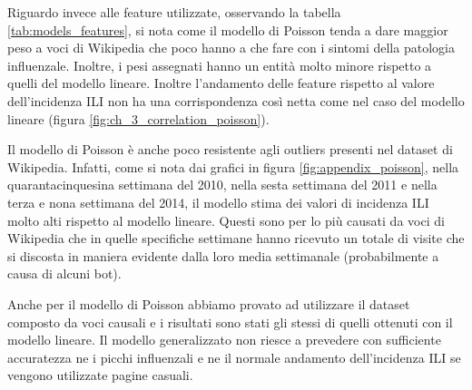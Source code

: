 Riguardo invece alle feature utilizzate, osservando la tabella \ref{tab:models_features}, si nota come il modello di 
Poisson tenda a dare maggior peso a voci di Wikipedia che poco hanno a che fare con i sintomi della patologia influenzale. 
Inoltre, i pesi assegnati hanno un entità molto minore rispetto a quelli del modello lineare. Inoltre  
l'andamento delle feature rispetto al valore dell'incidenza ILI non ha una corrispondenza così netta come nel caso del 
modello lineare (figura \ref{fig:ch_3_correlation_poisson}).
\bigskip

Il modello di Poisson è anche poco resistente agli outliers presenti nel dataset di Wikipedia. Infatti, come si nota dai 
grafici in figura \ref{fig:appendix_poisson}, nella quarantacinquesina settimana del 2010, nella sesta settimana del 2011 e 
nella terza e nona settimana del 2014, il modello stima dei valori di incidenza ILI molto alti rispetto al modello lineare.
Questi sono per lo più causati da voci di Wikipedia che in quelle specifiche settimane hanno ricevuto un totale di visite
che si discosta in maniera evidente dalla loro media settimanale (probabilmente a causa di alcuni bot).
\bigskip  

Anche per il modello di Poisson abbiamo provato ad utilizzare il dataset composto da voci causali e i risultati sono stati 
gli stessi di quelli ottenuti con il modello lineare. Il modello generalizzato non riesce a prevedere con sufficiente 
accuratezza ne i picchi influenzali e ne il normale andamento dell'incidenza ILI se vengono utilizzate pagine casuali. 

